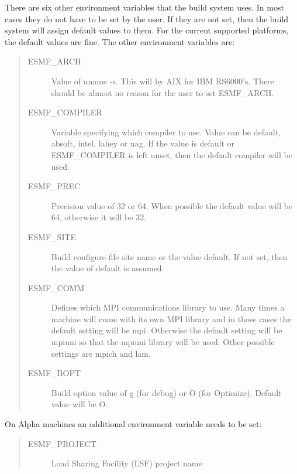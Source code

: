 There are six other environment variables that the build system uses.
In most cases they do not have to be set by the user.  If they are not
set, then the build system will assign default values to them.  For the
current supported platforms, the default values are fine.  The other
environment variables are:
\begin{quote}
\begin{description}

  \item[ESMF\_ARCH] Value of uname -s.  This will by AIX for IBM
                 RS6000's.  There should be almost no reason for the
                 user to set ESMF\_ARCH.

  \item[ESMF\_COMPILER] Variable specifying which compiler to use.  Value
                   can be default, absoft, intel, lahey or nag. 
                   If the value is default or ESMF\_COMPILER is 
                   left unset, then the default compiler 
                   will be used.      

  \item[ESMF\_PREC] Precision value of 32 or 64.  When possible the
                 default value will be 64, otherwise it will be 32.


  \item[ESMF\_SITE] Build configure file site name or the value
                 default.  If not set, then the value of default is
                 assumed.

  \item[ESMF\_COMM] Defines which MPI communications library to use.  
                   Many times a machine will come with its own MPI 
                   library and in those cases the default setting 
                   will be mpi.  Otherwise the default setting will be 
                   mpiuni so that the mpiuni library will be used.
                   Other possible settings are mpich and lam.

  \item[ESMF\_BOPT] Build option value of g (for debug) or O (for
                 Optimize).  Default value will be O.

\end{description}
\end{quote}

On Alpha machines an additional environment variable needs
to be set:

\begin{quote}
\begin{description}
  \item[ESMF\_PROJECT] Load Sharing Facility (LSF) project name
\end{description}
\end{quote}

